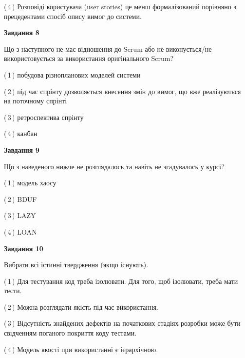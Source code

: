 \documentclass[10pt, ukrainian]{article}
\begin{document}
{\begin {large}
(\,4\,) Розповіді користувача (user stories) це менш формалізований порівняно з прецедентами спосіб опису вимог до системи. %


{\begin {center}\textbf{Завдання 8}\end {center}}\par
Що з наступного не має відношення до Scrum або не виконується/не використовується за використання оригінального Scrum?\par
\vspace{2mm}



(\,1\,) побудова різнопланових моделей системи%



(\,2\,) під час спрінту дозволяється внесення змін до вимог, що вже реалізуються на поточному спрінті%



(\,3\,) ретроспектива спрінту%



(\,4\,) канбан%


{\begin {center}\textbf{Завдання 9}\end {center}}\par
Що з наведеного нижче не розглядалось та навіть не згадувалось у курсі?\par
\vspace{2mm}



(\,1\,) модель хаосу%



(\,2\,) BDUF%



(\,3\,) LAZY%



(\,4\,) LOAN%


{\begin {center}\textbf{Завдання 10}\end {center}}\par
Вибрати всі істинні твердження (якщо існують).\par
\vspace{2mm}



(\,1\,) Для тестування код треба ізолювати. Для того, щоб ізолювати, треба мати тести.%



(\,2\,) Можна розглядати якість під час використання.%



(\,3\,) Відсутність знайдених дефектів на початкових стадіях розробки може бути свідченням поганого покриття коду тестами.%



(\,4\,) Модель якості при використанні є ієрархічною.%



\end {large}}
\end{document}
